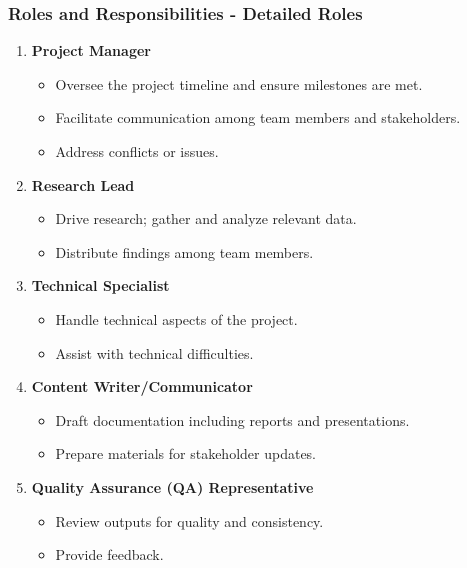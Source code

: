 \documentclass[aspectratio=169]{beamer}
\begin{document}
\begin{frame}[fragile]
    \frametitle{Roles and Responsibilities - Detailed Roles}
    \begin{enumerate}
        \item \textbf{Project Manager}
            \begin{itemize}
                \item Oversee the project timeline and ensure milestones are met.
                \item Facilitate communication among team members and stakeholders.
                \item Address conflicts or issues.
            \end{itemize}
        \item \textbf{Research Lead}
            \begin{itemize}
                \item Drive research; gather and analyze relevant data.
                \item Distribute findings among team members.
            \end{itemize}
        \item \textbf{Technical Specialist}
            \begin{itemize}
                \item Handle technical aspects of the project.
                \item Assist with technical difficulties.
            \end{itemize}
        \item \textbf{Content Writer/Communicator}
            \begin{itemize}
                \item Draft documentation including reports and presentations.
                \item Prepare materials for stakeholder updates.
            \end{itemize}
        \item \textbf{Quality Assurance (QA) Representative}
            \begin{itemize}
                \item Review outputs for quality and consistency.
                \item Provide feedback.
            \end{itemize}
    \end{enumerate}
\end{frame}
\end{document}
